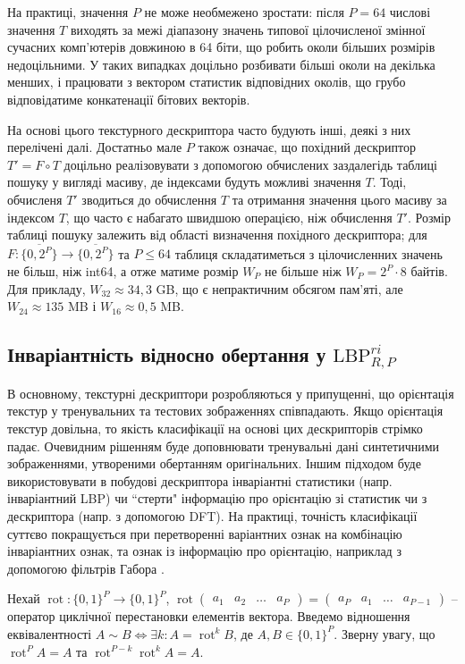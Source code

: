 На практиці, значення $P$ не може необмежено зростати: після $P=64$ числові значення $T$ виходять за межі діапазону значень типової цілочисленої змінної сучасних комп'ютерів довжиною в 64 біти, 
що робить околи більших розмірів недоцільними. У таких випадках доцільно розбивати більші околи на декілька менших, і працювати з вектором статистик відповідних околів,
що грубо відповідатиме конкатенації бітових векторів. 

На основі цього текстурного дескриптора часто будують інші, деякі з них перелічені далі.
Достатньо мале $P$ також означає, що похідний дескриптор $T' = F \circ T$ доцільно реалізовувати з допомогою обчислених заздалегідь таблиці пошуку у вигляді масиву, 
де індексами будуть можливі значення $T$.
Тоді, обчисленя $T'$ зводиться до обчислення $T$ та отримання значення цього масиву за індексом $T$, що часто є набагато швидшою операцією, ніж обчислення $T'$.
Розмір таблиці пошуку залежить від області визначення похідного дескриптора; 
для $F \colon \{\overline{0,2^P}\} \to \{\overline{0,2^P}\}$ та $P\le 64$ таблиця складатиметься з цілочисленних значень не більш, ніж int64, 
а отже матиме розмір $W_P$ не більше ніж $W_P = 2^P \cdot 8$ байтів. 
Для прикладу, $W_{32} \approx 34{,}3$ GB, що є непрактичним обсягом пам'яті, але $W_{24} \approx 135$ MB і $W_{16} \approx 0{,}5$ MB.

\subsection{Інваріантність відносно обертання у \(\mathrm{LBP}_{R,P}^{ri}\)}\label{section1.1c}\hfill

В основному, текстурні дескриптори розробляються у припущенні, що орієнтація текстур у тренувальних та тестових зображеннях співпадають.
Якщо орієнтація текстур довільна, то якість класифікації на основі цих дескрипторів стрімко падає. 
Очевидним рішенням буде доповнювати тренувальні дані синтетичними зображеннями, утвореними обертанням оригінальних. 
Іншим підходом буде використовувати в побудові дескриптора інваріантні статистики (напр. інваріантний LBP) чи 
``стерти" інформацію про орієнтацію зі статистик чи з дескриптора (напр. з допомогою DFT). 
На практиці, точність класифікації суттєво покращується при перетворенні варіантних ознак на комбінацію інваріантних ознак, та ознак із інформацію про орієнтацію, наприклад з допомогою фільтрів Габора \cite{guo2010lbpv}. 

Нехай $\operatorname{rot} : \{0,1\}^P \to \{0,1\}^P$, 
$\operatorname{rot} \begin{pmatrix}a_1 & a_2 & \dots  & a_P\end{pmatrix} = \begin{pmatrix}a_P & a_1 & \dots  & a_{P-1}\end{pmatrix}$ 
-- оператор циклічної перестановки елементів вектора.
Введемо відношення еквівалентності $A\sim B \iff \exists k: A = \operatorname{rot}^k B$, де $A,B \in \{0,1\}^P$.
Зверну увагу, що $\operatorname{rot}^P A = A$ та $\operatorname{rot}^{P-k} \operatorname{rot}^k A = A$.

